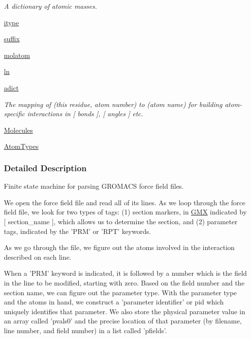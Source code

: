 \begin{DoxyCompactItemize}
\begin{DoxyCompactList}\small\item\em A dictionary of atomic masses. \end{DoxyCompactList}\item 
\hyperlink{classforcebalance_1_1gmxio_1_1ITP__Reader_a1809bf22503b8647f48ea37c9f6f4cee}{itype}
\item 
\hyperlink{classforcebalance_1_1gmxio_1_1ITP__Reader_a147438dd2683af88b92b659c96162848}{suffix}
\item 
\hyperlink{classforcebalance_1_1gmxio_1_1ITP__Reader_ad22477e12597eceeceedeb327d723094}{molatom}
\item 
\hyperlink{classforcebalance_1_1BaseReader_a80c8e3bea212600742968aa8669e557b}{ln}
\item 
\hyperlink{classforcebalance_1_1BaseReader_a2c46ad6b66cf09a30e917ce4a1997e2a}{adict}
\begin{DoxyCompactList}\small\item\em The mapping of (this residue, atom number) to (atom name) for building atom-\/specific interactions in \mbox{[} bonds \mbox{]}, \mbox{[} angles \mbox{]} etc. \end{DoxyCompactList}\item 
\hyperlink{classforcebalance_1_1BaseReader_a4369b5fb663a83b11602daa71db6862e}{Molecules}
\item 
\hyperlink{classforcebalance_1_1BaseReader_a69ca7d949a4a3df4d9f61e617fe0e270}{Atom\-Types}
\end{DoxyCompactItemize}


\subsubsection{Detailed Description}
Finite state machine for parsing G\-R\-O\-M\-A\-C\-S force field files. 

We open the force field file and read all of its lines. As we loop through the force field file, we look for two types of tags\-: (1) section markers, in \hyperlink{classforcebalance_1_1gmxio_1_1GMX}{G\-M\-X} indicated by \mbox{[} section\-\_\-name \mbox{]}, which allows us to determine the section, and (2) parameter tags, indicated by the 'P\-R\-M' or 'R\-P\-T' keywords.

As we go through the file, we figure out the atoms involved in the interaction described on each line.

When a 'P\-R\-M' keyword is indicated, it is followed by a number which is the field in the line to be modified, starting with zero. Based on the field number and the section name, we can figure out the parameter type. With the parameter type and the atoms in hand, we construct a 'parameter identifier' or pid which uniquely identifies that parameter. We also store the physical parameter value in an array called 'pvals0' and the precise location of that parameter (by filename, line number, and field number) in a list called 'pfields'.

